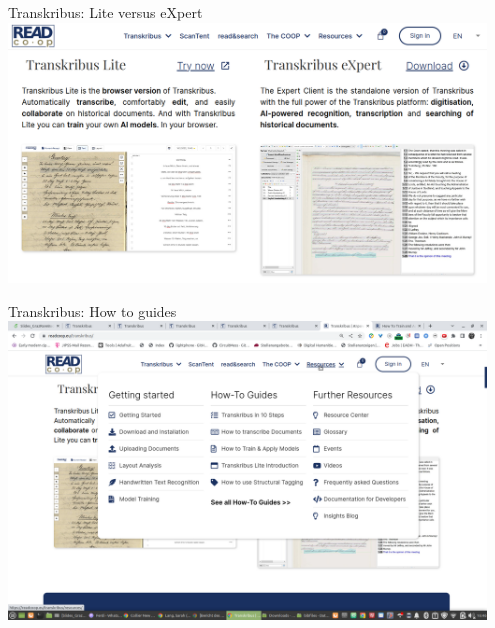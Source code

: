 \begin{frame}{Transkribus: Lite versus eXpert}
    \includegraphics[width=0.95\textwidth]{img/transkribus-versions.png}
\end{frame}
\begin{frame}{Transkribus: How to guides}
    \includegraphics[width=0.95\textwidth]{img/transkribus-resources.png}
\end{frame}
